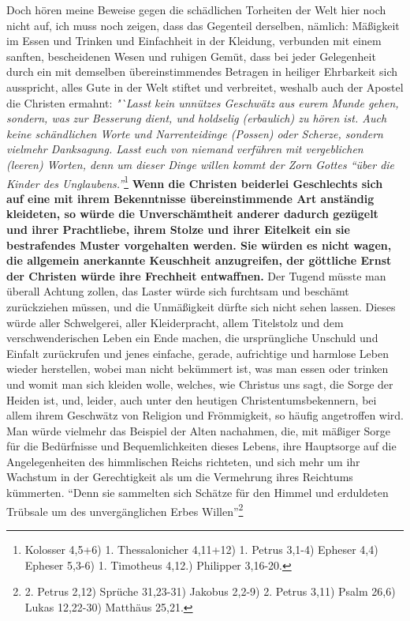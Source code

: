 Doch hören meine Beweise gegen die schädlichen Torheiten der Welt hier noch
nicht auf, ich muss noch zeigen, dass das Gegenteil derselben, nämlich:
Mäßigkeit
im Essen und Trinken und Einfachheit in der Kleidung, verbunden mit einem
sanften, bescheidenen Wesen und ruhigen Gemüt, dass bei jeder Gelegenheit durch
ein mit demselben übereinstimmendes Betragen in heiliger Ehrbarkeit sich
ausspricht, alles Gute in der Welt stiftet und verbreitet, weshalb auch der
Apostel die Christen ermahnt:
\textit{"`Lasst kein unnützes Geschwätz aus eurem Munde
gehen, sondern, was zur Besserung dient, und holdselig (erbaulich) zu hören
ist. Auch keine schändlichen Worte und Narrenteidinge (Possen) oder Scherze,
sondern vielmehr Danksagung. Lasst euch von niemand verführen mit vergeblichen
(leeren) Worten, denn um dieser Dinge willen kommt der Zorn Gottes "`über die
Kinder des Unglaubens."'}\footnote{
Kolosser 4,5+6)
1. Thessalonicher 4,11+12)
1. Petrus 3,1-4)
Epheser 4,4)
Epheser 5,3-6)
1. Timotheus 4,12.)
Philipper 3,16-20.}
\label{ref:18_08_vorbild_kleidung}\textbf{Wenn die Christen
beiderlei Geschlechts sich auf eine mit ihrem Bekenntnisse übereinstimmende Art
anständig kleideten, so würde die Unverschämtheit anderer dadurch gezügelt und
ihrer Prachtliebe, ihrem Stolze und ihrer Eitelkeit ein sie bestrafendes Muster
vorgehalten werden. Sie würden es nicht wagen, die allgemein anerkannte
Keuschheit anzugreifen, der göttliche Ernst der Christen würde ihre Frechheit
entwaffnen.} Der Tugend müsste man überall Achtung zollen, das Laster würde
sich furchtsam und beschämt zurückziehen müssen, und die Unmäßigkeit dürfte sich
nicht sehen lassen. Dieses würde aller Schwelgerei, aller Kleiderpracht, allem
Titelstolz und dem verschwenderischen Leben ein Ende machen, die ursprüngliche
Unschuld und Einfalt zurückrufen und jenes einfache, gerade, aufrichtige und
harmlose Leben wieder herstellen, wobei man nicht bekümmert ist, was man essen
oder trinken und womit man sich kleiden wolle, welches, wie Christus uns sagt,
die Sorge der Heiden ist, und, leider, auch unter den heutigen
Christentumsbekennern, bei allem ihrem Geschwätz von Religion und
Frömmigkeit, so häufig angetroffen wird. Man würde vielmehr das Beispiel der
Alten nachahmen, die, mit mäßiger Sorge für die Bedürfnisse und Bequemlichkeiten
dieses Lebens, ihre Hauptsorge auf die Angelegenheiten des himmlischen
Reichs
richteten, und sich mehr um ihr Wachstum in der Gerechtigkeit als um die
Vermehrung ihres Reichtums kümmerten. "`Denn sie sammelten sich Schätze für
den Himmel und erduldeten Trübsale um des unvergänglichen Erbes
Willen"'\footnote{
2. Petrus 2,12)
Sprüche 31,23-31)
Jakobus 2,2-9)
2. Petrus 3,11)
Psalm 26,6)
Lukas 12,22-30)
Matthäus 25,21.}

